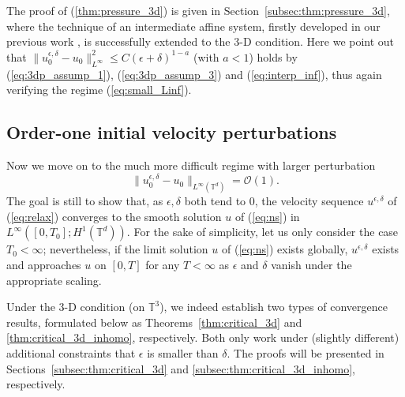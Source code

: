 \documentclass[reqno,10pt]{amsart}
\theoremstyle{definition}
\theoremstyle{remark}
\numberwithin{equation}{section}
\begin{document}
The proof of (\ref{thm:pressure_3d}) is given in Section~\ref{subsec:thm:pressure_3d}, where the technique of an intermediate affine system, firstly developed in our previous work \cite{HRYZ25}, is successfully extended to the 3-D condition. Here we point out that $\|u^{\epsilon,\delta}_0-u_0\|_{L^\infty}^2\le C(\epsilon+\delta)^{1-a}$ (with $a<1$) holds by (\ref{eq:3dp_assump_1}), (\ref{eq:3dp_assump_3}) and (\ref{eq:interp_inf}), thus again verifying the regime (\ref{eq:small_Linf}).

\subsection{Order-one initial velocity perturbations}

Now we move on to the much more difficult regime with larger perturbation
\begin{equation} \label{eq:O1_Linf} 
    \|u_0^{\epsilon,\delta}-u_0 \|_{L^\infty(\mathbb T^d)}=\mathcal O(1).
\end{equation}
The goal is still to show that, as $\epsilon,\delta$ both tend to 0, the velocity sequence $u^{\epsilon,\delta}$ of (\ref{eq:relax}) converges to the smooth solution $u$ of (\ref{eq:ns}) in $L^\infty([0,T_0];H^1(\mathbb T^d))$. For the sake of simplicity, let us only consider the case $T_0<\infty$; nevertheless, if the limit solution $u$ of (\ref{eq:ns}) exists globally, $u^{\epsilon,\delta}$ exists and approaches $u$ on $[0, T]$ for any $T < \infty$ as $\epsilon$ and $\delta$ vanish under the appropriate scaling.


Under the 3-D condition (on $\mathbb T^3$), we indeed establish two types of convergence results, formulated below as Theorems~\ref{thm:critical_3d} and \ref{thm:critical_3d_inhomo}, respectively. Both only work under (slightly different) additional constraints that $\epsilon$ is smaller than $\delta$. The proofs will be presented in Sections~\ref{subsec:thm:critical_3d} and \ref{subsec:thm:critical_3d_inhomo}, respectively.
\end{document}
